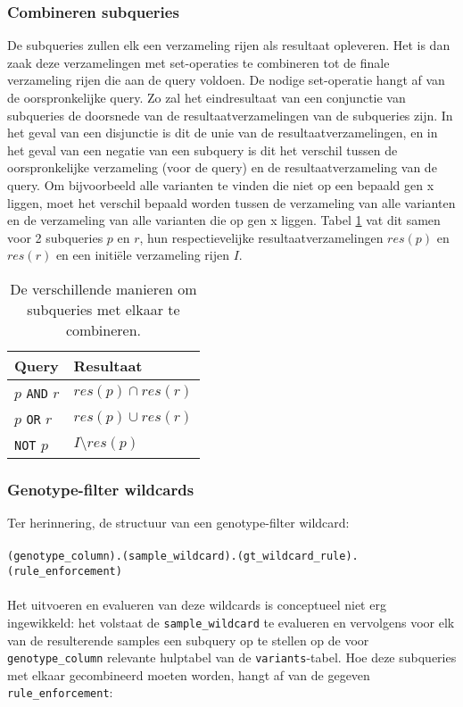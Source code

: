 \subsubsection{Combineren subqueries}
\label{comb_subq_concept}
De subqueries zullen elk een verzameling rijen als resultaat opleveren. Het is dan zaak deze verzamelingen met set-operaties te combineren tot de finale verzameling rijen die aan de query voldoen. De nodige set-operatie hangt af van de oorspronkelijke query. Zo zal het eindresultaat van een conjunctie van subqueries de doorsnede van de resultaatverzamelingen van de subqueries zijn. In het geval van een disjunctie is dit de unie van de resultaatverzamelingen, en in het geval van een negatie van een subquery is dit het verschil tussen de oorspronkelijke verzameling (voor de query) en de resultaatverzameling van de query. Om bijvoorbeeld alle varianten te vinden die niet op een bepaald gen x liggen, moet het verschil bepaald worden tussen de verzameling van alle varianten en de verzameling van alle varianten die op gen x liggen. Tabel \ref{combineren_subqueries} vat dit samen voor 2 subqueries $p$ en $r$, hun respectievelijke resultaatverzamelingen $res(p)$ en $res(r)$ en een initi\"ele verzameling rijen $I$.

\begin{table}[h]
\centering
\begin{tabular}{|l|l|}
\hline
\textbf{Query} & \textbf{Resultaat}    \\ \hline
$p$ \texttt{AND} $r$ & $res(p) \cap res(r)$   \\ \hline
$p$ \texttt{OR} $r$ & $res(p) \cup res(r)$    \\ \hline
\texttt{NOT} $p$  & $I \setminus res(p)$ \\ \hline
\end{tabular}
\caption{De verschillende manieren om subqueries met elkaar te combineren.}
\label{combineren_subqueries}
\end{table}

\subsubsection{Genotype-filter wildcards}

Ter herinnering, de structuur van een genotype-filter wildcard:\\\\
\texttt{(genotype\_column).(sample\_wildcard).(gt\_wildcard\_rule).(rule\_enforcement)}\\\\
Het uitvoeren en evalueren van deze wildcards is conceptueel niet erg ingewikkeld: het volstaat de \texttt{sample\_wildcard} te evalueren en vervolgens voor elk van de resulterende samples een subquery op te stellen op de voor \texttt{genotype\_column} relevante hulptabel van de \texttt{variants}-tabel. Hoe deze subqueries met elkaar gecombineerd moeten worden, hangt af van de gegeven \texttt{rule\_enforcement}:

